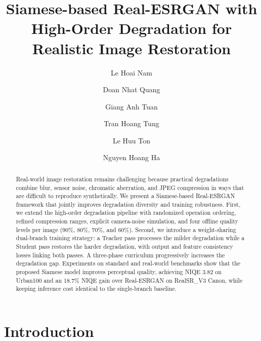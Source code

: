 \documentclass[runningheads]{llncs}
\begin{document}
\title{Siamese-based Real-ESRGAN with High-Order Degradation for Realistic Image Restoration}

\author{Le Hoai Nam \and Doan Nhat Quang \and Giang Anh Tuan \and
Tran Hoang Tung \and Le Huu Ton \and Nguyen Hoang Ha}


\maketitle

\begin{abstract}
Real-world image restoration remains challenging because practical degradations combine blur, sensor noise, chromatic aberration, and JPEG compression in ways that are difficult to reproduce synthetically. We present a Siamese-based Real-ESRGAN framework that jointly improves degradation diversity and training robustness. First, we extend the high-order degradation pipeline with randomized operation ordering, refined compression ranges, explicit camera-noise simulation, and four offline quality levels per image (90\%, 80\%, 70\%, and 60\%). Second, we introduce a weight-sharing dual-branch training strategy: a Teacher pass processes the milder degradation while a Student pass restores the harder degradation, with output and feature consistency losses linking both passes. A three-phase curriculum progressively increases the degradation gap. Experiments on standard and real-world benchmarks show that the proposed Siamese model improves perceptual quality, achieving NIQE 3.82 on Urban100 and an 18.7\% NIQE gain over Real-ESRGAN on RealSR\_V3 Canon, while keeping inference cost identical to the single-branch baseline.

\end{abstract}

\section{Introduction}
\end{document}
